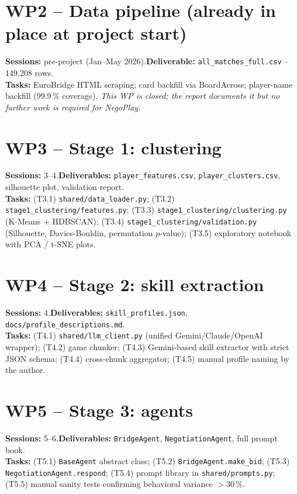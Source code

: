 \documentclass[11pt, a4paper, oneside, openany]{report}
\begin{document}
\section*{WP2 -- Data pipeline (already in place at project start)}
\textbf{Sessions:} pre-project (Jan--May 2026).\quad \textbf{Deliverable:} \texttt{all\_matches\_full.csv} -- 149{,}208 rows.\\
\textbf{Tasks:} EuroBridge HTML scraping; card backfill via BoardAcross; player-name backfill (99.9\,\% coverage). \emph{This WP is closed; the report documents it but no further work is required for NegoPlay.}

\section*{WP3 -- Stage 1: clustering}
\textbf{Sessions:} 3--4.\quad \textbf{Deliverables:} \texttt{player\_features.csv}, \texttt{player\_clusters.csv}, silhouette plot, validation report.\\
\textbf{Tasks:} (T3.1) \texttt{shared/data\_loader.py}; (T3.2) \texttt{stage1\_clustering/features.py}; (T3.3) \texttt{stage1\_clustering/clustering.py} (K-Means + HDBSCAN); (T3.4) \texttt{stage1\_clustering/validation.py} (Silhouette, Davies-Bouldin, permutation $p$-value); (T3.5) exploratory notebook with PCA / t-SNE plots.

\section*{WP4 -- Stage 2: skill extraction}
\textbf{Sessions:} 4.\quad \textbf{Deliverables:} \texttt{skill\_profiles.json}, \texttt{docs/profile\_descriptions.md}.\\
\textbf{Tasks:} (T4.1) \texttt{shared/llm\_client.py} (unified Gemini/Claude/OpenAI wrapper); (T4.2) game chunker; (T4.3) Gemini-based skill extractor with strict JSON schema; (T4.4) cross-chunk aggregator; (T4.5) manual profile naming by the author.

\section*{WP5 -- Stage 3: agents}
\textbf{Sessions:} 5--6.\quad \textbf{Deliverables:} \texttt{BridgeAgent}, \texttt{NegotiationAgent}, full prompt book.\\
\textbf{Tasks:} (T5.1) \texttt{BaseAgent} abstract class; (T5.2) \texttt{BridgeAgent.make\_bid}; (T5.3) \texttt{NegotiationAgent.respond}; (T5.4) prompt library in \texttt{shared/prompts.py}; (T5.5) manual sanity tests confirming behavioral variance $> 30\,\%$.
\end{document}
